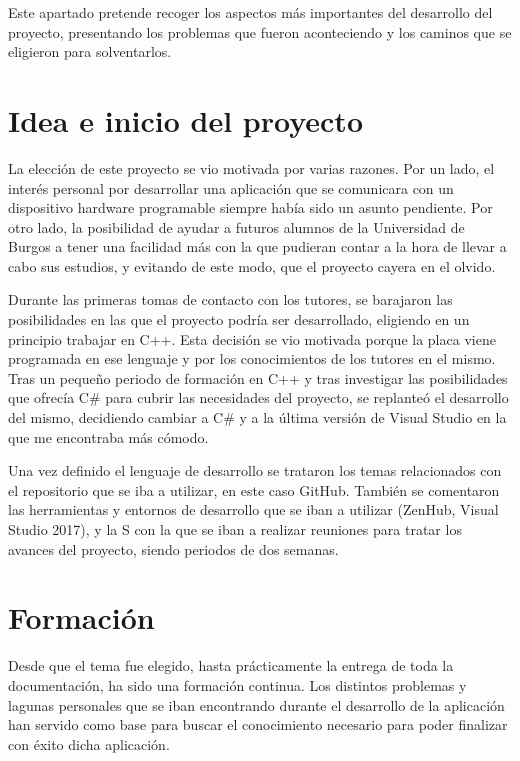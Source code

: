 
Este apartado pretende recoger los aspectos más importantes del desarrollo del proyecto, presentando los problemas que fueron aconteciendo y los caminos que se eligieron para solventarlos.

\section{Idea e inicio del proyecto}

La elección de este proyecto se vio motivada por varias razones. Por un lado, el interés personal por desarrollar una aplicación que se comunicara con un dispositivo hardware programable siempre había sido un asunto pendiente. Por otro lado, la posibilidad de ayudar a futuros alumnos de la Universidad de Burgos a tener una facilidad más con la que pudieran contar a la hora de llevar a cabo sus estudios, y evitando de este modo, que el proyecto cayera en el olvido.

Durante las primeras tomas de contacto con los tutores, se barajaron las posibilidades en las que el proyecto podría ser desarrollado, eligiendo en un principio trabajar en C++. Esta decisión se vio motivada porque la placa viene programada en ese lenguaje y por los conocimientos de los tutores en el mismo. Tras un pequeño periodo de formación en C++ y tras investigar las posibilidades que ofrecía C\# para cubrir las necesidades del proyecto, se replanteó el desarrollo del mismo, decidiendo cambiar a C\# y a la última versión de Visual Studio en la que me encontraba más cómodo.

Una vez definido el lenguaje de desarrollo se trataron los temas relacionados con el repositorio que se iba a utilizar, en este caso GitHub. También se comentaron las herramientas y entornos de desarrollo que se iban a utilizar (ZenHub, Visual Studio 2017), y la S con la que se iban a realizar reuniones para tratar los avances del proyecto, siendo periodos de dos semanas.

\section{Formación}

Desde que el tema fue elegido, hasta prácticamente la entrega de toda la documentación, ha sido una formación continua. Los distintos problemas y lagunas personales que se iban encontrando durante el desarrollo de la aplicación han servido como base para buscar el conocimiento necesario para poder finalizar con éxito dicha aplicación.

